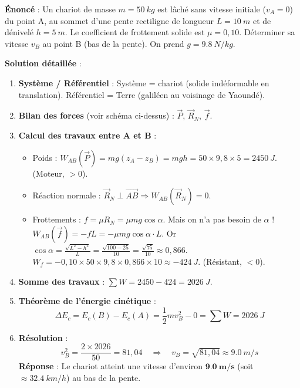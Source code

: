\documentclass[11pt]{article}
\begin{document}
\begin{exoresolu}
\textbf{Énoncé} : Un chariot de masse $m = \SI{50}{kg}$ est lâché sans vitesse initiale ($v_A = 0$) du point A, au sommet d'une pente rectiligne de longueur $L = \SI{10}{m}$ et de dénivelé $h = \SI{5}{m}$. Le coefficient de frottement solide est $\mu = 0,10$. Déterminer sa vitesse $v_B$ au point B (bas de la pente). On prend $g = \SI{9,8}{N/kg}$.

\textbf{Solution détaillée} :
\begin{enumerate}
    \item \textbf{Système / Référentiel} : Système = chariot (solide indéformable en translation). Référentiel = Terre (galiléen au voisinage de Yaoundé).
    \item \textbf{Bilan des forces} (voir schéma ci-dessus) : $\vec{P}$, $\vec{R}_N$, $\vec{f}$.
    \item \textbf{Calcul des travaux entre A et B} :
    \begin{itemize}
        \item Poids : $W_{AB}(\vec{P}) = mg(z_A - z_B) = mgh = 50 \times 9,8 \times 5 = \SI{2450}{J}$. (Moteur, $>0$).
        \item Réaction normale : $\vec{R}_N \perp \overrightarrow{AB} \Rightarrow W_{AB}(\vec{R}_N) = 0$.
        \item Frottements : $f = \mu R_N = \mu mg\cos\alpha$. Mais on n'a pas besoin de $\alpha$ ! $W_{AB}(\vec{f}) = -f L = -\mu mg\cos\alpha \cdot L$.
            Or $\cos\alpha = \frac{\sqrt{L^2 - h^2}}{L} = \frac{\sqrt{100-25}}{10} = \frac{\sqrt{75}}{10} \approx 0,866$.
            $W_f = -0,10 \times 50 \times 9,8 \times 0,866 \times 10 \approx \SI{-424}{J}$. (Résistant, $<0$).
    \end{itemize}
    \item \textbf{Somme des travaux} : $\sum W = 2450 - 424 = \SI{2026}{J}$.
    \item \textbf{Théorème de l'énergie cinétique} :
    \[
    \Delta E_c = E_c(B) - E_c(A) = \frac{1}{2} m v_B^2 - 0 = \sum W = \SI{2026}{J}
    \]
    \item \textbf{Résolution} :
    \[
    v_B^2 = \frac{2 \times 2026}{50} = 81,04 \quad\Rightarrow\quad v_B = \sqrt{81,04} \approx \SI{9,0}{m/s}
    \]
    \textbf{Réponse} : Le chariot atteint une vitesse d'environ $\mathbf{\SI{9,0}{m/s}}$ (soit $\approx \SI{32,4}{km/h}$) au bas de la pente.
\end{enumerate}
\end{exoresolu}
\end{document}

